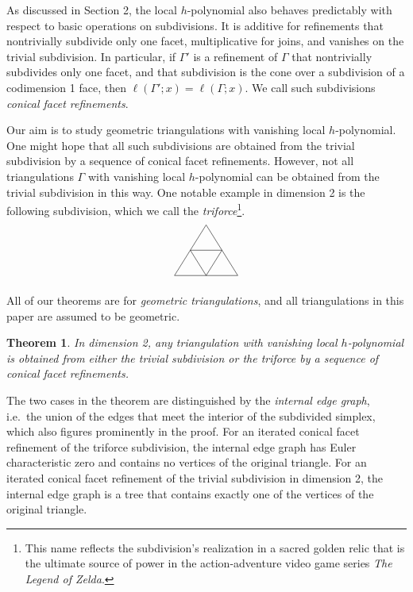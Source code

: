 \documentclass[10pt]{amsart}
\newtheorem{theorem}{Theorem}[section]
\newcommand{\ie}{i.e.\ }
\begin{document}
As discussed in Section 2, the local $h$-polynomial also behaves predictably with respect 
to basic operations on subdivisions. It is additive for refinements that nontrivially 
subdivide only one facet, multiplicative for joins, and vanishes on the trivial subdivision. 
In particular, if $\Gamma'$ is a refinement of $\Gamma$ that nontrivially subdivides only
one facet, and that subdivision is the cone over a subdivision of a codimension 1 face, 
then $\ell(\Gamma';x) = \ell(\Gamma;x)$. We call such subdivisions 
\emph{conical facet refinements}. 

Our aim is to study geometric triangulations with vanishing local $h$-polynomial.
One might hope that all such subdivisions are obtained from the trivial subdivision by a 
sequence of conical facet refinements. 
However, not all triangulations $\Gamma$ with vanishing local $h$-polynomial can be obtained from 
the trivial subdivision in this way. One notable example
in dimension 2 is the following subdivision, which we call the 
\emph{triforce}\footnote{This name reflects the subdivision's realization in a sacred
golden relic that is the ultimate source of power in the action-adventure video game 
series \emph{The Legend of Zelda}.}.
\[
\begin{tikzpicture}[scale=2]
\draw (0.5,0.8) -- (1,0) -- (0,0) -- (0.5,0.8);
\draw (0.75,0.4) -- (0.5,0) -- (0.25,0.4) -- (0.75,0.4);
\end{tikzpicture}
\]

All of our theorems are for \emph{geometric triangulations}, and all triangulations in this paper are assumed to be geometric.

\begin{theorem} \label{thm:dim2}
In dimension 2, any triangulation with vanishing local $h$-polynomial is obtained from either the trivial subdivision or the triforce by a sequence of conical facet refinements.
\end{theorem}

\noindent The two cases in the theorem are distinguished by the \emph{internal edge graph}, \ie the union of the edges that meet the interior of the subdivided simplex, which also figures prominently in the proof. For an iterated conical facet refinement of the triforce subdivision, the internal edge graph has Euler characteristic zero and contains no vertices of the original triangle. For an iterated conical facet refinement of the trivial subdivision in dimension 2, the internal edge graph is a tree that contains exactly one of the vertices of the original triangle.
\end{document}
